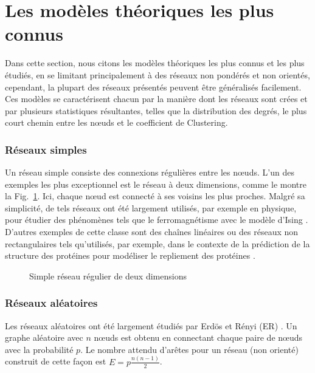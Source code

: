 \section{Les modèles théoriques les plus connus} 
Dans cette section, nous citons les modèles théoriques les plus connus et les plus étudiés, en se limitant principalement à des réseaux non pondérés et non orientés, cependant, la plupart des réseaux présentés peuvent être généralisés facilement. Ces modèles se caractérisent chacun par la manière dont les réseaux sont crées et par plusieurs statistiques résultantes, telles que la distribution des degrés, le plus court chemin entre les nœuds et le coefficient de Clustering.

\subsubsection{Réseaux simples}
Un réseau simple consiste des connexions régulières entre les nœuds. L'un des exemples les plus exceptionnel est le réseau à deux dimensions, comme le montre la Fig.~\ref{Ising2}. Ici, chaque nœud est connecté à ses voisins les plus proches. Malgré sa simplicité, de tels réseaux ont été largement utilisés, par exemple en physique, pour étudier des phénomènes tels que le ferromagnétisme avec le modèle d'Ising \cite{Chowdhury-Stauffer2000}. D'autres exemples de cette classe sont des chaînes linéaires ou des réseaux non rectangulaires tels qu'utilisés, par exemple, dans le contexte de la prédiction de la structure des protéines pour modéliser le repliement des protéines \cite{Hsu-al2003,Dehmer2011}.
\begin{figure}[h!]
	\centering
{}
\caption{Simple réseau régulier de deux dimensions}
\label{Ising2}
\end{figure}
\subsubsection{Réseaux aléatoires}
Les réseaux aléatoires ont été largement étudiés par Erdös et Rényi (ER) \cite{Erdos-Renyi1959,Erdos-Renyi1960,Erdos-Renyi1961}.
Un graphe aléatoire avec $n$ nœuds est obtenu en connectant chaque paire de nœuds avec la probabilité $p$. Le nombre attendu d'arêtes pour un réseau (non orienté) construit
de cette façon est $E=p\frac{n(n-1)}{2}$.

